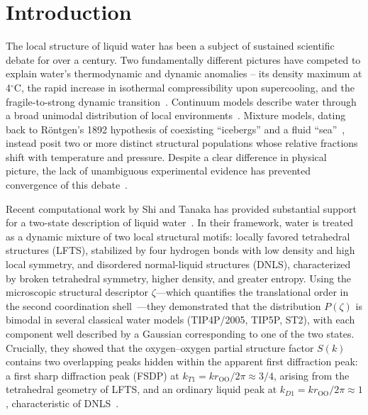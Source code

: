 \documentclass[aps, amsmath,amssymb, reprint, onecolumn,notitlepage,superscriptaddress]{revtex4-2}
\begin{document}
\maketitle

\section{Introduction}
The local structure of liquid water has been a subject of sustained scientific debate for over a century. Two fundamentally different pictures have competed to explain water's thermodynamic and dynamic anomalies -- its density maximum at 4$^\circ$C, the rapid increase in isothermal compressibility upon supercooling, and the fragile-to-strong dynamic transition~\cite{gallo_water_2016}. Continuum models describe water through a broad unimodal distribution of local environments~\cite{narten_observed_1969, eisenberg_structure_2005}. Mixture models, dating back to R\"{o}ntgen's 1892 hypothesis of coexisting ``icebergs'' and a fluid
``sea''~\cite{rontgen-1892}, instead posit two or more distinct structural populations whose relative fractions shift with temperature and pressure. Despite a clear difference in physical picture, the lack of unambiguous experimental evidence has prevented convergence of this
debate~\cite{narten_observed_1969, eisenberg_structure_2005, handle_supercooled_2017}.

Recent computational work by Shi and Tanaka has provided substantial support for a two-state description of liquid water~\cite{shi_direct_2020, russo_understanding_2014, shi_microscopic_2018}. In their framework, water is treated as a dynamic mixture of two local structural motifs: locally favored tetrahedral structures (LFTS), stabilized by four hydrogen bonds with low density and high local symmetry, and disordered normal-liquid structures (DNLS), characterized by broken tetrahedral symmetry, higher density, and greater entropy. Using the
microscopic structural descriptor $\zeta$---which quantifies the translational order in the second coordination shell~\cite{russo_understanding_2014}---they demonstrated that the distribution $P(\zeta)$ is bimodal in several classical water models (TIP4P/2005, TIP5P, ST2), with each component well described by a Gaussian
corresponding to one of the two states. Crucially, they showed that the oxygen--oxygen partial structure factor $S(k)$ contains two overlapping peaks hidden within the apparent first diffraction peak: a first sharp diffraction peak (FSDP) at $k_{T1} = kr_{\mathrm{OO}}/2\pi \approx 3/4$, arising from the tetrahedral geometry of LFTS, and an ordinary liquid peak at $k_{D1} = kr_{\mathrm{OO}}/2\pi \approx 1$, characteristic of DNLS~\cite{shi_direct_2020, shi-2019}.
\end{document}
